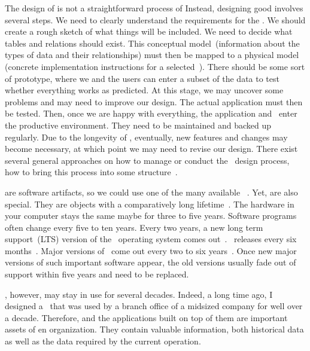 %
The design of  is not a straightforward process of 
Instead, designing good  involves several steps.
We need to clearly understand the requirements for the \db.
We should create a rough sketch of what things will be included.
We need to decide what tables and relations should exist.
This conceptual model~(information about the types of data and their relationships) must then be mapped to a physical model (concrete implementation instructions for a selected~\dbms).
There should be some sort of prototype, where we and the users can enter a subset of the data to test whether everything works as predicted.
At this stage, we may uncover some problems and may need to improve our design.
The actual application must then be tested.
Then, once we are happy with everything, the application and \db\ enter the productive environment.
They need to be maintained and backed up regularly.
Due to the longevity of , eventually, new features and changes may become necessary, at which point we may need to revise our design.
There exist several general approaches on how to manage or conduct the \db\ design process, how to bring this process into some structure~\cite{GMTM2011DDLC}.

 are software artifacts, so we could use one of the many available ~\cite{I2018SAH,N2024SEFDS}.
Yet,  are also special.
They are objects with a comparatively long lifetime~\cite{SS2005EIDDDFDB:I}.
The hardware in your computer stays the same maybe for three to five years.
Software programs often change every five to ten years.
Every two years, a new long term support~(LTS) version of the \ubuntu\ operating system comes out~\cite{C2024TULARC}.
\libreoffice\ releases every six months~\cite{DF2024TDFWR}.
Major versions of \microsoftWindows\ come out every two to six years~\cite{GLRGRLJH2025LOWV}.
Once new major versions of such important software appear, the old versions usually fade out of support within five years and need to be replaced.

, however, may stay in use for several decades.
Indeed, a long time ago, I designed a \db\ that was used by a branch office of a midsized company for well over a decade.
Therefore,  and the applications built on top of them are important assets of en organization.
They contain valuable information, both historical data as well as the data required by the current operation.

